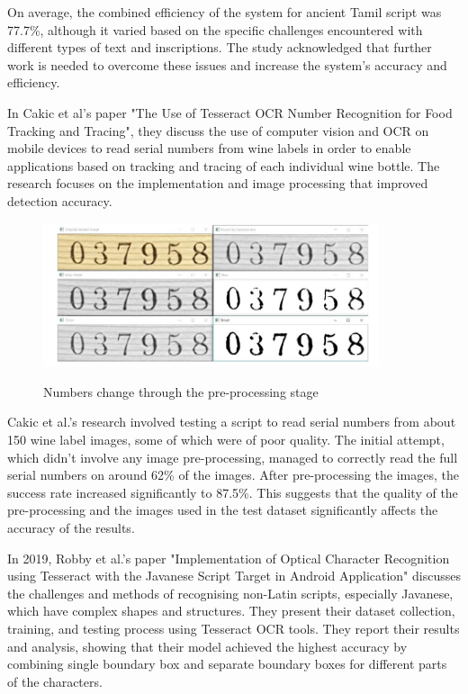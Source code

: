 On average, the combined efficiency of the system for ancient Tamil script was 77.7\%, although it varied based on the specific challenges encountered with different types of text and inscriptions. The study acknowledged that further work is needed to overcome these issues and increase the system's accuracy and efficiency.\cite{giridharNovelApproachOCR2019}

In Cakic et al's paper "The Use of Tesseract OCR Number Recognition for Food Tracking and Tracing", they discuss the use of computer vision and OCR on mobile devices to read serial numbers from wine labels in order to enable applications based on tracking and tracing of each individual wine bottle. The research focuses on the implementation and image processing that improved detection accuracy.

\begin{figure}[ht]
    \centering
    \includegraphics[width=0.88\textwidth]{Figures/tesseract_papers/Cakic_2020.jpg}
    \caption[Numbers change through the pre-processing stage]{Numbers change through the pre-processing stage}\cite{cakicUseTesseractOCR2020}
    \label{fig:Cakic's Numbers change through the preprocessing stage}
\end{figure}

Cakic et al.'s research involved testing a script to read serial numbers from about 150 wine label images, some of which were of poor quality. The initial attempt, which didn't involve any image pre-processing, managed to correctly read the full serial numbers on around 62\% of the images. After pre-processing the images, the success rate increased significantly to 87.5\%. This suggests that the quality of the pre-processing and the images used in the test dataset significantly affects the accuracy of the results.

In 2019, Robby et al.'s paper "Implementation of Optical Character Recognition using Tesseract with the Javanese Script Target in Android Application" discusses the challenges and methods of recognising non-Latin scripts, especially Javanese, which have complex shapes and structures. They present their dataset collection, training, and testing process using Tesseract OCR tools. They report their results and analysis, showing that their model achieved the highest accuracy by combining single boundary box and separate boundary boxes for different parts of the characters.

